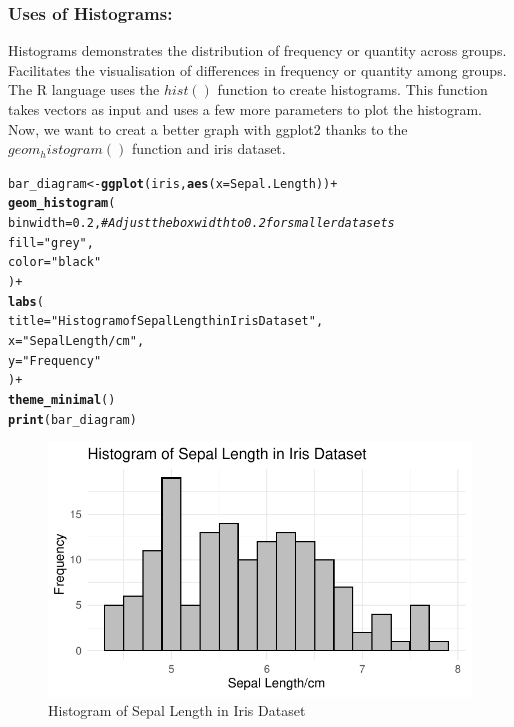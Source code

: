 \documentclass{article}\usepackage[]{graphicx}\usepackage[]{xcolor}
\makeatletter
\def\maxwidth{ %
  \ifdim\Gin@nat@width>\linewidth
    \linewidth
  \else
    \Gin@nat@width
  \fi
}
\newcommand{\hlnum}[1]{\textcolor[rgb]{0.686,0.059,0.569}{#1}}%
\newcommand{\hlstr}[1]{\textcolor[rgb]{0.192,0.494,0.8}{#1}}%
\newcommand{\hlcom}[1]{\textcolor[rgb]{0.678,0.584,0.686}{\textit{#1}}}%
\newcommand{\hlopt}[1]{\textcolor[rgb]{0,0,0}{#1}}%
\newcommand{\hlstd}[1]{\textcolor[rgb]{0.345,0.345,0.345}{#1}}%
\newcommand{\hlkwb}[1]{\textcolor[rgb]{0.69,0.353,0.396}{#1}}%
\newcommand{\hlkwc}[1]{\textcolor[rgb]{0.333,0.667,0.333}{#1}}%
\newcommand{\hlkwd}[1]{\textcolor[rgb]{0.737,0.353,0.396}{\textbf{#1}}}%
\newenvironment{kframe}{%
 \def\at@end@of@kframe{}%
 \ifinner\ifhmode%
  \def\at@end@of@kframe{\end{minipage}}%
  \begin{minipage}{\columnwidth}%
 \fi\fi%
 \def\FrameCommand##1{\hskip\@totalleftmargin \hskip-\fboxsep
 \colorbox{shadecolor}{##1}\hskip-\fboxsep
     \hskip-\linewidth \hskip-\@totalleftmargin \hskip\columnwidth}%
 \MakeFramed {\advance\hsize-\width
   \@totalleftmargin\z@ \linewidth\hsize
   \@setminipage}}%
 {\par\unskip\endMakeFramed%
 \at@end@of@kframe}
\newenvironment{knitrout}{}{} %
\makeatother
\begin{document}
\subsubsection{Uses of Histograms:}
Histograms demonstrates the distribution of frequency or quantity across groups.\\
Facilitates the visualisation of differences in frequency or quantity among groups.\\
The R language uses the $hist()$ function to create histograms. This function takes vectors as input and uses a few more parameters to plot the histogram.\\
Now, we want to creat a better graph with ggplot2 thanks to the $geom_histogram()$ function and iris dataset.\\
\begin{knitrout}
\color{fgcolor}\begin{kframe}
\begin{alltt}
\hlstd{bar_diagram} \hlkwb{<-} \hlkwd{ggplot}\hlstd{(iris,} \hlkwd{aes}\hlstd{(}\hlkwc{x} \hlstd{= Sepal.Length))} \hlopt{+}
  \hlkwd{geom_histogram}\hlstd{(}
    \hlkwc{binwidth} \hlstd{=} \hlnum{0.2}\hlstd{,}  \hlcom{# Adjust the box width to 0.2 for smaller data sets}
    \hlkwc{fill} \hlstd{=} \hlstr{"grey"}\hlstd{,}
    \hlkwc{color} \hlstd{=} \hlstr{"black"}
  \hlstd{)} \hlopt{+}
  \hlkwd{labs}\hlstd{(}
    \hlkwc{title} \hlstd{=} \hlstr{"Histogram of Sepal Length in Iris Dataset"}\hlstd{,}
    \hlkwc{x} \hlstd{=} \hlstr{"Sepal Length/cm"}\hlstd{,}
    \hlkwc{y} \hlstd{=} \hlstr{"Frequency"}
  \hlstd{)} \hlopt{+}
  \hlkwd{theme_minimal}\hlstd{()}
\hlkwd{print}\hlstd{(bar_diagram)}
\end{alltt}
\end{kframe}\begin{figure}
\includegraphics[width=\maxwidth]{figure/hist3-1} \caption[Histogram of Sepal Length in Iris Dataset]{Histogram of Sepal Length in Iris Dataset}\label{fig:hist3}
\end{figure}

\end{knitrout}
\end{document}
